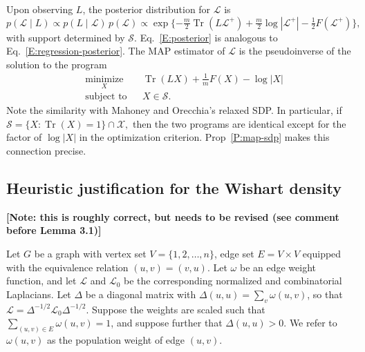 \documentclass[12pt]{article}
\DeclareMathOperator*{\Tr}{Tr}
\theoremstyle{plain}
\begin{document}
Upon observing $L$, the posterior distribution for $\mathcal{L}$ is
\begin{equation}\label{E:posterior}
  p(\mathcal{L} \mid L)
    \propto p(L \mid \mathcal{L}) \, p (\mathcal{L})
    \propto \exp\{ -\tfrac{m}{2} \Tr(L \mathcal{L}^+)
                   + \tfrac{m}{2} \log |\mathcal{L}^+|
                   - \tfrac{1}{2} F(\mathcal{L^+}) \},
\end{equation}
with support determined by $\mathcal{S}$.  Eq.~\eqref{E:posterior} is
analogous to Eq.~\eqref{E:regression-posterior}.  The MAP estimator of
$\mathcal{L}$ is the pseudoinverse of the solution to the program
\[
\begin{aligned}
  & \underset{X}{\text{minimize}}
  & & \Tr(L X) + \tfrac{1}{m} F(X) - \log |X| \\
  & \text{subject to}
  & & X \in \mathcal{S}.
\end{aligned}
\]
Note the similarity with Mahoney and Orecchia's relaxed SDP.
In particular, if
\(
  \mathcal{S} = \{ X : \Tr(X) = 1 \} \cap \mathcal{X},
\)
then the two programs are identical except for the factor of
$\log |X|$ in the optimization criterion.  Prop~\ref{P:map-sdp} makes
this connection precise.



\subsection{Heuristic justification for the Wishart density}

\textbf{[Note: this is roughly correct, but needs to be revised (see
  comment before Lemma 3.1)]}

Let $G$ be a graph with vertex set $V = \{ 1, 2, \dotsc, n \}$, edge
set $E = V \times V$ equipped with the equivalence relation
$(u,v) = (v,u)$.  Let $\omega$ be an edge weight function, and let
$\mathcal{L}$ and $\mathcal{L}_0$ be the corresponding normalized and
combinatorial Laplacians.  Let $\Delta$ be a diagonal matrix with
$\Delta(u,u) = \sum_{v} \omega(u,v)$, so that
$\mathcal{L} = \Delta^{-1/2} \mathcal{L}_0 \Delta^{-1/2}$.  Suppose
the weights are scaled such that $\sum_{(u,v) \in E} \omega(u,v) = 1$,
and suppose further that $\Delta(u,u) > 0$.
We refer to $\omega(u,v)$ as the population weight of edge $(u,v)$.
\end{document}
